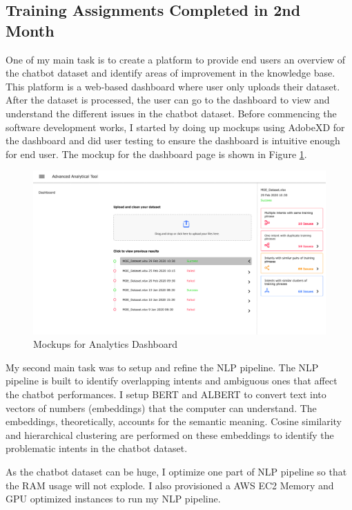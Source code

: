 \subsection{Training Assignments Completed in 2nd Month}
\noindent
One of my main task is to create a platform to provide end users an overview of the chatbot dataset and identify areas of improvement in the knowledge base. This platform is a web-based dashboard where user only uploads their dataset. After the dataset is processed, the user can go to the dashboard to view and understand the different issues in the chatbot dataset. Before commencing the software development works, I started by doing up mockups using AdobeXD for the dashboard and did user testing to ensure the dashboard is intuitive enough for end user. The mockup for the dashboard page is shown in Figure \ref{fig:aat-dashboard}.

\begin{figure}[h!]
	\begin{center}
		\includegraphics[width=450px]{assets/images/aat-dashboard.png}
		\caption{Mockups for Analytics Dashboard}
		\label{fig:aat-dashboard}
	\end{center}
\end{figure}

\noindent
My second main task was to setup and refine the NLP pipeline. The NLP pipeline is built to identify overlapping intents and ambiguous ones that affect the chatbot performances. I setup BERT and ALBERT to convert text into vectors of numbers (embeddings) that the computer can understand. The embeddings, theoretically, accounts for the semantic meaning. Cosine similarity and hierarchical clustering are performed on these embeddings to identify the problematic intents in the chatbot dataset.

\noindent
As the chatbot dataset can be huge, I optimize one part of NLP pipeline so that the RAM usage will not explode. I also provisioned a AWS EC2 Memory and GPU optimized instances to run my NLP pipeline. 

